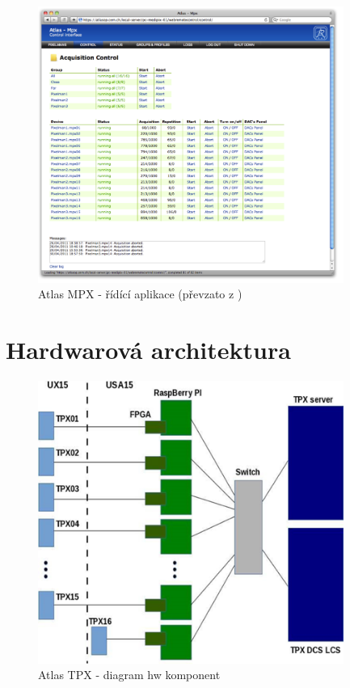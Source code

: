 \begin{figure}[ht]
	\begin{center}
		\includegraphics[width=10cm]{figures/mpx_web.png}
		\caption{Atlas MPX - řídící aplikace (převzato z \cite{TurecekThesis2011})}
		\label{fig:mpx_web}
	\end{center}
\end{figure}

\section{Hardwarová architektura}\label{atlas:hw_arch}

\begin{figure}[ht]
	\begin{center}
		\includegraphics[width=10cm]{figures/tpx_hw_diagram.png}
		\caption{Atlas TPX - diagram hw komponent}
		\label{fig:tpx_hw_diagram}
	\end{center}
\end{figure}


